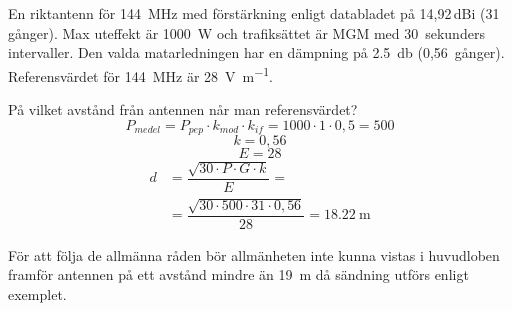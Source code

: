 \begin{exempelbox}
En riktantenn för \qty{144}{\mega\hertz} med förstärkning enligt databladet på
14,92\,dBi (31 gånger).
Max uteffekt är \qty{1000}{\watt} och trafiksättet är MGM med 30~sekunders
intervaller.
Den valda matarledningen har en dämpning på \qty{2,5}{\decibel} (0,56~gånger).
Referensvärdet för \qty{144}{\mega\hertz} är \qty{28}{\volt\per\metre}.

På vilket avstånd från antennen når man referensvärdet?
\tcblower
\noindent
\[P_{medel} = P_{pep} \cdot k_{mod} \cdot k_{if}
= 1000 \cdot 1 \cdot 0,5 = 500\]
\[k = 0,56\]
\[E = 28\]
\begin{align*}
  d &= \dfrac{\sqrt{30 \cdot P \cdot G \cdot k}}{E} =\\
&= \dfrac{\sqrt{30 \cdot 500 \cdot 31 \cdot 0,56}}{28}
  = \qty{18,22}{\metre}
  \end{align*}

För att följa de allmänna råden bör allmänheten inte kunna vistas i huvudloben
framför antennen på ett avstånd mindre än \qty{19}{\metre} då sändning utförs
enligt exemplet.
\end{exempelbox}
